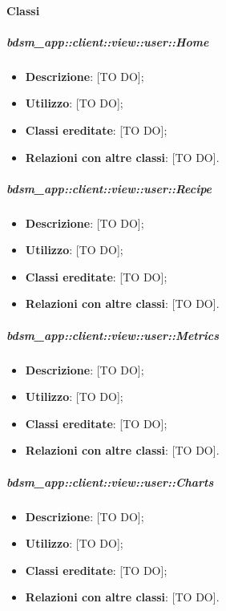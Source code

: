 		\paragraph{Classi} %
			\subparagraph{bdsm\_app::client::view::user::Home} %
			\label{subp:bdsm_app_client_view_user_home}
				\begin{itemize}
					\item \textbf{Descrizione}: [TO DO];
					\item \textbf{Utilizzo}: [TO DO];
					\item \textbf{Classi ereditate}: [TO DO];
					\item \textbf{Relazioni con altre classi}: [TO DO].
				\end{itemize}

			\subparagraph{bdsm\_app::client::view::user::Recipe} %
			\label{subp:bdsm_app_client_view_user_recipe}
				\begin{itemize}
					\item \textbf{Descrizione}: [TO DO];
					\item \textbf{Utilizzo}: [TO DO];
					\item \textbf{Classi ereditate}: [TO DO];
					\item \textbf{Relazioni con altre classi}: [TO DO].
				\end{itemize}

			\subparagraph{bdsm\_app::client::view::user::Metrics} %
			\label{subp:bdsm_app_client_view_metrics}
				\begin{itemize}
					\item \textbf{Descrizione}: [TO DO];
					\item \textbf{Utilizzo}: [TO DO];
					\item \textbf{Classi ereditate}: [TO DO];
					\item \textbf{Relazioni con altre classi}: [TO DO].
				\end{itemize}

			\subparagraph{bdsm\_app::client::view::user::Charts} %
			\label{subp:bdsm_app_client_view_user_charts}
				\begin{itemize}
					\item \textbf{Descrizione}: [TO DO];
					\item \textbf{Utilizzo}: [TO DO];
					\item \textbf{Classi ereditate}: [TO DO];
					\item \textbf{Relazioni con altre classi}: [TO DO].
				\end{itemize}

